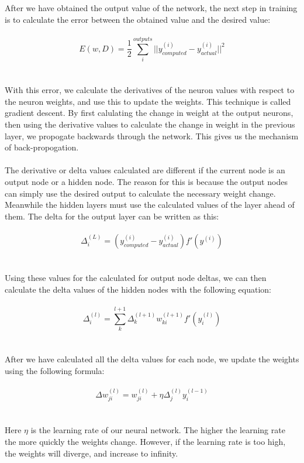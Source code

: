 \documentclass[paper=a4, fontsize=11pt]{scrartcl} %
\numberwithin{equation}{section} %
\numberwithin{figure}{section} %
\numberwithin{table}{section} %
\begin{document}
	\\\\
	After we have obtained the output value of the network, the next step in training is to calculate the error between the obtained value and the desired value:
	\\\\
	$$E(w, D) = \frac{1}{2}\sum_i^{outputs}||y_{computed}^{(i)} - y_{actual}^{(i)}||^2$$
	\\\\
	With this error, we calculate the derivatives of the neuron values with respect to the neuron weights, and use this to update the weights. This technique is called gradient descent. By first calulating the change in weight at the output neurons, then using the derivative values to calculate the change in weight in the previous layer, we propogate backwards through the network. This gives us the mechanism of back-propogation.
	\\\\
	The derivative or delta values calculated are different if the current node is an output node or a hidden node. The reason for this is because the output nodes can simply use the desired output to calculate the necessary weight change. Meanwhile the hidden layers must use the calculated values of the layer ahead of them. The delta for the output layer can be written as this:
	\\\\
	$$\Delta_i^{(L)} = (y_{computed}^{(i)} - y_{actual}^{(i)})f'(y^{(i)})$$
	\\\\
	Using these values for the calculated for output node deltas, we can then calculate the delta values of the hidden nodes with the following equation:
	\\\\
	$$\Delta_i^{(l)} =  \sum^{l+1}_k \Delta_k^{(l+1)}w_{ki}^{(l+1)}f'(y_i^{(l)})$$
	\\\\
	After we have calculated all the delta values for each node, we update the weights using the following formula:
	\\\\
	$$\Delta w_{ji}^{(l)} = w_{ji}^{(l)} + \eta\Delta_j^{(l)}y_i^{(l-1)}$$
	\\\\
	Here $\eta$ is the learning rate of our neural network. The higher the learning rate the more quickly the weights change. However, if the learning rate is too high, the weights will diverge, and increase to infinity. 
\end{document}
